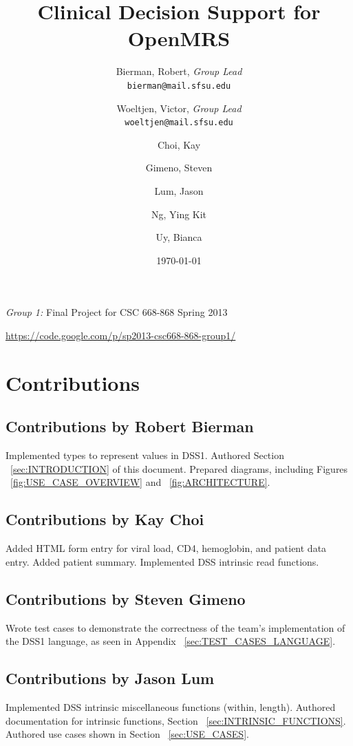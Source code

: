 \documentclass[12pt,letterpaper]{article}
\title{
  Clinical Decision Support for OpenMRS
}
\author{
        Bierman, Robert,  \emph{Group Lead}  \\ \texttt{bierman@mail.sfsu.edu} \and 
        Woeltjen, Victor, \emph{Group Lead}  \\ \texttt{woeltjen@mail.sfsu.edu} \and
        Choi, Kay       \and
        Gimeno, Steven  \and
        Lum, Jason      \and
        Ng, Ying Kit    \and
        Uy, Bianca      
}
\date{\today}
\begin{document}
\setcounter{tocdepth}{2}

\newpage 

\maketitle
\begin{center}
\begin{Large}\emph{Group 1:} Final Project for CSC 668-868 Spring 2013\end{Large} \linebreak
\url{https://code.google.com/p/sp2013-csc668-868-group1/}
\end{center}
\thispagestyle{empty} %

\newpage {}
\tableofcontents
\listoffigures
\listoftables

\newpage {}
\section{Contributions} 

\subsection{Contributions by Robert Bierman}
Implemented types to represent values in DSS1. Authored Section 
~\ref{sec:INTRODUCTION} of this document. Prepared diagrams, including 
Figures ~\ref{fig:USE_CASE_OVERVIEW} and ~\ref{fig:ARCHITECTURE}.

\subsection{Contributions by Kay Choi}
Added HTML form entry for viral load, CD4, hemoglobin, and 
patient data entry. Added patient summary. Implemented DSS intrinsic read 
functions.

\subsection{Contributions by Steven Gimeno}
Wrote test cases to demonstrate the correctness of the team's implementation 
of the DSS1 language, as seen in Appendix ~\ref{sec:TEST_CASES_LANGUAGE}.

\subsection{Contributions by Jason Lum}
Implemented DSS intrinsic miscellaneous functions (within, length). 
Authored documentation for intrinsic functions, Section ~\ref{sec:INTRINSIC_FUNCTIONS}. Authored use cases shown in Section ~\ref{sec:USE_CASES}.
\end{document}
